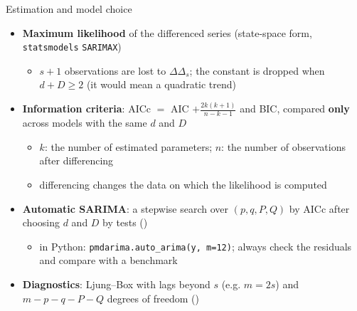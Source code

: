 \begin{frame}{Estimation and model choice}
\itemsize{\small}
\begin{itemize}
    \item \textbf{Maximum likelihood} of the differenced series (state-space form, \texttt{statsmodels} \texttt{SARIMAX})
    \begin{itemize}
        \item $s + 1$ observations are lost to $\Delta\Delta_s$; the constant is dropped when $d + D \ge 2$ (it would mean a quadratic trend)
    \end{itemize}
    \item \textbf{Information criteria}: AICc $=$ AIC $+ \frac{2k(k + 1)}{n - k - 1}$ and BIC, compared \textbf{only} across models with the same $d$ and $D$
    \begin{itemize}
        \item $k$: the number of estimated parameters; $n$: the number of observations after differencing
        \item differencing changes the data on which the likelihood is computed
    \end{itemize}
    \item \textbf{Automatic SARIMA}: a stepwise search over $(p, q, P, Q)$ by AICc after choosing $d$ and $D$ by tests ()
    \begin{itemize}
        \item in Python: \texttt{pmdarima.auto\_arima(y, m=12)}; always check the residuals and compare with a benchmark
    \end{itemize}
    \item \textbf{Diagnostics}: Ljung--Box with lags beyond $s$ (e.g. $m = 2s$) and $m - p - q - P - Q$ degrees of freedom ()
\end{itemize}
\end{frame}

